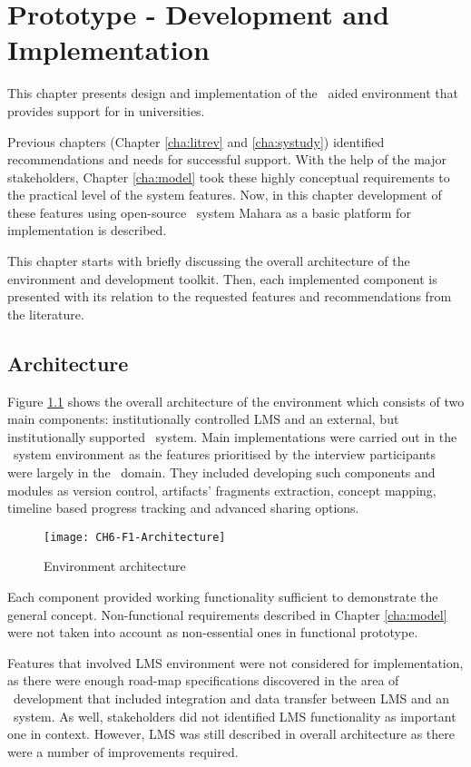 \chapter{Prototype - Development and Implementation\label{cha:prototype}}
This chapter presents design and implementation of the \ep~aided environment
that provides support for \LLLs in universities.

Previous chapters (Chapter \ref{cha:litrev} and \ref{cha:systudy}) identified
recommendations and needs for successful \LLLs support. With the help of the
major stakeholders, Chapter \ref{cha:model} took these highly conceptual
requirements to the practical level of the system features. Now, in this chapter
development of these features using open-source \ep~system Mahara as a basic
platform for implementation is described.

This chapter starts with briefly discussing the overall architecture of the
environment and development toolkit. Then, each implemented component is
presented with its relation to the requested features and \LLLs recommendations
from the literature.

\section{Architecture}

Figure \ref{fig:arch} shows the overall architecture of the environment which
consists of two main components: institutionally controlled LMS and an external,
but institutionally supported \ep~system. Main implementations were carried
out in the \ep~system environment as the features prioritised by the interview
participants were largely in the \ep~domain. They included developing such
components and modules as version control, artifacts' fragments extraction,
concept mapping, timeline based progress tracking and advanced sharing options.

\begin{figure}[htp]
\centering
\texttt{[image: CH6-F1-Architecture]}
\caption{Environment architecture}
\label{fig:arch}
\end{figure}

Each component provided working functionality sufficient to demonstrate the
general concept. Non-functional requirements described in Chapter
\ref{cha:model} were not taken into account as non-essential ones in functional
prototype.

Features that involved LMS environment were not considered for implementation,
as there were enough road-map specifications discovered in the area of
\ep~development that included integration and data transfer between LMS and an
\ep~system. As well, stakeholders did not identified LMS functionality as
important one in \LLLs context. However, LMS was still described in overall
architecture as there were a number of improvements required.

